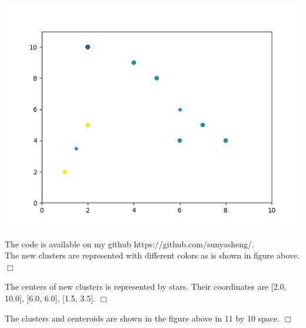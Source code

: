 \documentclass[12pt]{article}
\newenvironment{proofof}[1]{\bigskip\noindent{\itshape #1. }}{\hfill$\Box$\medskip}
\begin{document}
	\begin{center}
		\includegraphics[angle = 0, width = .8\textwidth]{./images/fig6.png}
	\end{center}
	The code is available on my github https://github.com/sunyasheng/.\\
\begin{proofof}a
 	The new clusters are represented with different colors as is shown in figure above.
\end{proofof}

\begin{proofof}b
	The centers of new clusters is represented by stars. Their coordinates are [2.0, 10.0], [6.0, 6.0], [1.5, 3.5].
\end{proofof}

\begin{proofof}c
	The clusters and centeroids are shown in the figure above in 11 by 10 space. 
\end{proofof}
\end{document}
